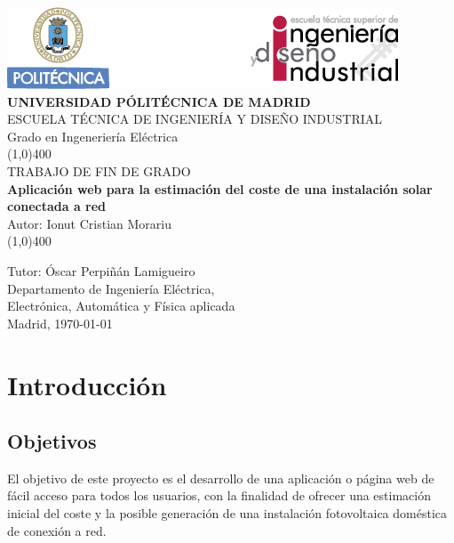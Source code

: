 \documentclass[11pt]{report}
\begin{document}
\begin{titlepage}



\begin{center}
	\includegraphics[scale=1]{cabecera}\\
	\vspace*{1cm}
	\Large{\textbf{\MakeUppercase{Universidad Pólitécnica de Madrid}}}\\[3mm]
	\Large{{\MakeUppercase{Escuela técnica de ingeniería y diseño industrial}}}\\[3mm]
	\Large {Grado en Ingeneriería Eléctrica}\\
	\vfill
	\line(1,0){400}\\
	\Large{{\MakeUppercase{Trabajo de fin de grado}}}\\
	\Huge{\textbf{Aplicación web para la estimación del coste de una instalación solar conectada a red}}\\[5mm]
	\Large{Autor: Ionut Cristian Morariu}\\
	\line(1,0){400}\\
	\vfill
\end{center}
\begin{flushright}
\Large {Tutor: Óscar Perpiñán Lamigueiro}\\[3mm]
\Large{Departamento de Ingeniería Eléctrica,\\ Electrónica, Automática y Física aplicada}\\[10mm]
Madrid, \today
\end{flushright}

\end{titlepage}

\renewcommand{\baselinestretch}{1.5} %
\renewcommand{\labelitemi}{\textbullet}

\tableofcontents
\thispagestyle{empty}
\clearpage

\setcounter{page}{1}


\chapter{Introducción}
\section{Objetivos}
El objetivo de este proyecto es el desarrollo de una aplicación o página web de fácil acceso para todos los usuarios, con la finalidad de ofrecer una estimación inicial del coste y la posible generación de una instalación fotovoltaica doméstica de conexión a red.\\
\end{document}
